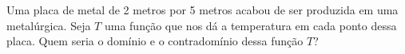 Uma placa de metal de 2 metros por 5 metros acabou de ser produzida em uma metalúrgica.
Seja $T$ uma função que nos dá a temperatura em cada ponto dessa placa.
Quem seria o domínio e o contradomínio dessa função $T$?
